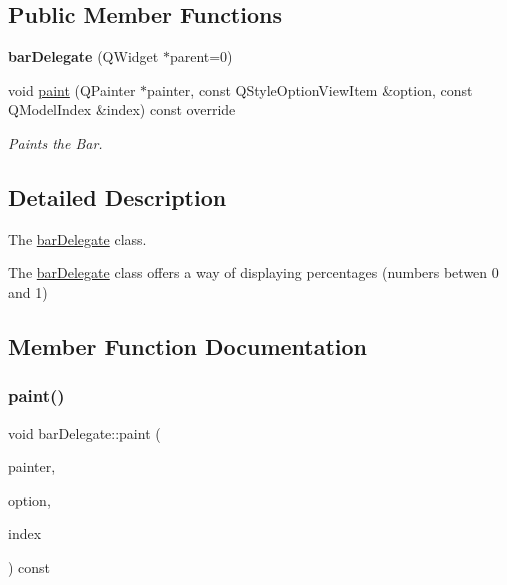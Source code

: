 \subsection*{Public Member Functions}
\begin{DoxyCompactItemize}
\item 
\mbox{\label{classbar_delegate_af31b0c196427b7856e88167594253f44}} 
{\bfseries bar\+Delegate} (Q\+Widget $\ast$parent=0)
\item 
void \mbox{\hyperlink{classbar_delegate_ab3f8bec486210494bdd9ecb7179ef355}{paint}} (Q\+Painter $\ast$painter, const Q\+Style\+Option\+View\+Item \&option, const Q\+Model\+Index \&index) const override
\begin{DoxyCompactList}\small\item\em Paints the Bar. \end{DoxyCompactList}\end{DoxyCompactItemize}


\subsection{Detailed Description}
The \mbox{\hyperlink{classbar_delegate}{bar\+Delegate}} class. 

The \mbox{\hyperlink{classbar_delegate}{bar\+Delegate}} class offers a way of displaying percentages (numbers betwen 0 and 1) 

\subsection{Member Function Documentation}
\mbox{\label{classbar_delegate_ab3f8bec486210494bdd9ecb7179ef355}} 
\subsubsection{\texorpdfstring{paint()}{paint()}}
{\footnotesize\ttfamily void bar\+Delegate\+::paint (\begin{DoxyParamCaption}\item[{Q\+Painter $\ast$}]{painter,  }\item[{const Q\+Style\+Option\+View\+Item \&}]{option,  }\item[{const Q\+Model\+Index \&}]{index }\end{DoxyParamCaption}) const\hspace{0.3cm}{\ttfamily [override]}}



